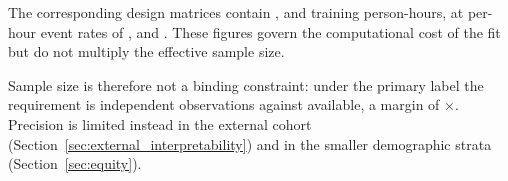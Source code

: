 The corresponding design matrices contain \pcNTrainPersonHA{},
\pcNTrainPersonHB{} and \pcNTrainPersonHC{} training person-hours, at per-hour
event rates of \pcPerHourRateA{}, \pcPerHourRateB{} and \pcPerHourRateC{}.
These figures govern the computational cost of the fit but do not multiply the
effective sample size.

Sample size is therefore not a binding constraint: under the primary label the
requirement is \pcMinNRileyStayB{} independent observations against
\pcNTrainStays{} available, a margin of \pcRileyMarginB$\times$. Precision is
limited instead in the external cohort
(Section~\ref{sec:external_interpretability}) and in the smaller demographic
strata (Section~\ref{sec:equity}).
